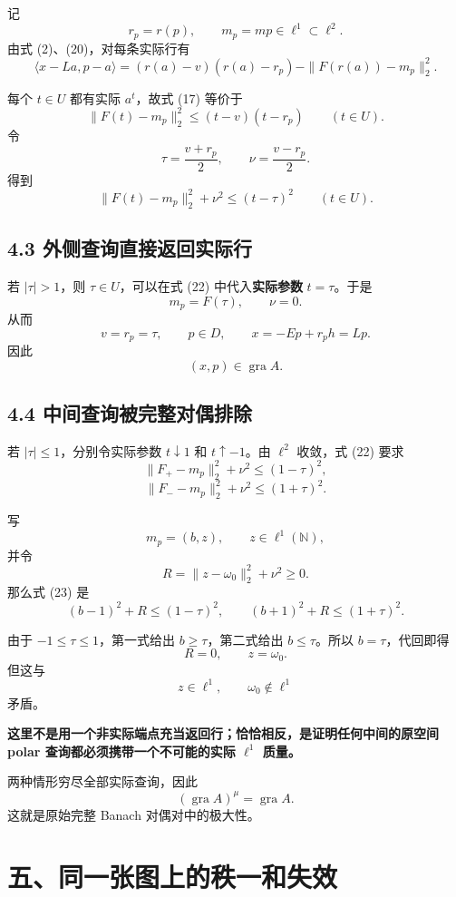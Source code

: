 \documentclass[UTF8,fontset=fandol,11pt,a4paper]{ctexart}
\begin{document}
记 \[
r_p=r(p),\qquad m_p=mp\in\ell^1\subset\ell^2.
\] 由式 (2)、(20)，对每条实际行有 \[
\boxed{
\langle x-La,p-a\rangle
=
(r(a)-v)(r(a)-r_p)
-\|F(r(a))-m_p\|_2^2.
}
\tag{21}
\]

每个 $t\in U$ 都有实际 $a^t$，故式 (17) 等价于 \[
\|F(t)-m_p\|_2^2\le(t-v)(t-r_p)
\qquad(t\in U).
\] 令 \[
\tau=\frac{v+r_p}{2},\qquad
\nu=\frac{v-r_p}{2}.
\] 得到 \[
\boxed{
\|F(t)-m_p\|_2^2+\nu^2
\le(t-\tau)^2
\qquad(t\in U).
}
\tag{22}
\]

\subsection{4.3 外侧查询直接返回实际行}\label{ux5916ux4fa7ux67e5ux8be2ux76f4ux63a5ux8fd4ux56deux5b9eux9645ux884c}

若 $|\tau|>1$，则 $\tau\in U$，可以在式 (22) 中代入\textbf{实际参数} $t=\tau$。于是 \[
m_p=F(\tau),\qquad \nu=0.
\] 从而 \[
v=r_p=\tau,\qquad p\in D,\qquad
x=-Ep+r_ph=Lp.
\] 因此 \[
(x,p)\in\operatorname{gra}A.
\]

\subsection{4.4 中间查询被完整对偶排除}\label{ux4e2dux95f4ux67e5ux8be2ux88abux5b8cux6574ux5bf9ux5076ux6392ux9664}

若 $|\tau|\le1$，分别令实际参数 $t\downarrow1$ 和 $t\uparrow-1$。由 $\ell^2$ 收敛，式 (22) 要求 \[
\|F_+-m_p\|_2^2+\nu^2\le(1-\tau)^2,
\] \[
\|F_--m_p\|_2^2+\nu^2\le(1+\tau)^2.
\tag{23}
\]

写 \[
m_p=(b,z),\qquad z\in\ell^1(\mathbb N),
\] 并令 \[
R=\|z-\omega_0\|_2^2+\nu^2\ge0.
\] 那么式 (23) 是 \[
(b-1)^2+R\le(1-\tau)^2,
\qquad
(b+1)^2+R\le(1+\tau)^2.
\tag{24}
\]

由于 $-1\le\tau\le1$，第一式给出 $b\ge\tau$，第二式给出 $b\le\tau$。所以 $b=\tau$，代回即得 \[
R=0,\qquad z=\omega_0.
\] 但这与 \[
z\in\ell^1,\qquad\omega_0\notin\ell^1
\] 矛盾。

\textbf{这里不是用一个非实际端点充当返回行；恰恰相反，是证明任何中间的原空间 polar 查询都必须携带一个不可能的实际 $\ell^1$ 质量。}

两种情形穷尽全部实际查询，因此 \[
\boxed{
(\operatorname{gra}A)^\mu=\operatorname{gra}A.
}
\tag{25}
\] 这就是原始完整 Banach 对偶对中的极大性。

\section{五、同一张图上的秩一和失效}\label{ux4e94ux540cux4e00ux5f20ux56feux4e0aux7684ux79e9ux4e00ux548cux5931ux6548}
\end{document}
